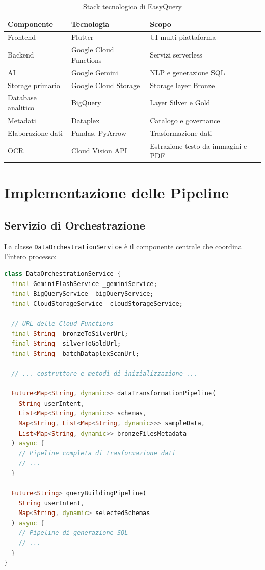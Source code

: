 \documentclass[11pt,a4paper,twoside]{report}
\begin{document}
\begin{table}[H]
\centering
\begin{tabular}{lll}
\toprule
\textbf{Componente} & \textbf{Tecnologia} & \textbf{Scopo}\\
\midrule
Frontend & Flutter & UI multi-piattaforma\\
Backend & Google Cloud Functions & Servizi serverless\\
AI & Google Gemini & NLP e generazione SQL\\
Storage primario & Google Cloud Storage & Storage layer Bronze\\
Database analitico & BigQuery & Layer Silver e Gold\\
Metadati & Dataplex & Catalogo e governance\\
Elaborazione dati & Pandas, PyArrow & Trasformazione dati\\
OCR & Cloud Vision API & Estrazione testo da immagini e PDF\\
\bottomrule
\end{tabular}
\caption{Stack tecnologico di EasyQuery}
\label{tab:tech_stack}
\end{table}

\section{Implementazione delle Pipeline}

\subsection{Servizio di Orchestrazione}
La classe \texttt{DataOrchestrationService} è il componente centrale che coordina l'intero processo:

\begin{lstlisting}[language=Dart, caption=Implementazione DataOrchestrationService]
class DataOrchestrationService {
  final GeminiFlashService _geminiService;
  final BigQueryService _bigQueryService;
  final CloudStorageService _cloudStorageService;

  // URL delle Cloud Functions
  final String _bronzeToSilverUrl;
  final String _silverToGoldUrl;
  final String _batchDataplexScanUrl;

  // ... costruttore e metodi di inizializzazione ...

  Future<Map<String, dynamic>> dataTransformationPipeline(
    String userIntent,
    List<Map<String, dynamic>> schemas,
    Map<String, List<Map<String, dynamic>>> sampleData,
    List<Map<String, dynamic>> bronzeFilesMetadata
  ) async {
    // Pipeline completa di trasformazione dati
    // ...
  }

  Future<String> queryBuildingPipeline(
    String userIntent, 
    Map<String, dynamic> selectedSchemas
  ) async {
    // Pipeline di generazione SQL
    // ...
  }
}
\end{lstlisting}
\end{document}

